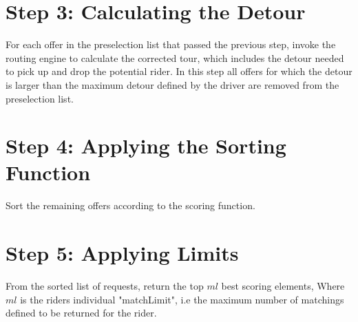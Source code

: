 \section{Step 3: Calculating the Detour}
\label{sfdCalculatingDetour}
For each offer in the preselection list that passed the previous step, invoke the routing engine to calculate 
the corrected tour,  which includes the detour needed to pick up and drop the potential rider.
In this step all offers for which the detour is larger than the maximum detour defined by the driver
are removed from the preselection list. 	
      
\section{Step 4: Applying the Sorting Function}
\label{sfdSortingFunction}
Sort the remaining offers according to the scoring function.

\section{Step 5: Applying Limits}
\label{sfdApplyingLimits}
From the sorted list of requests, return the top $ml$ best scoring elements,
Where $ml$ is the riders individual "matchLimit", i.e the maximum number of 
matchings defined to be returned for the rider.
	
